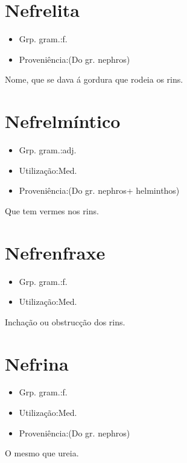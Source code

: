 \section{Nefrelita}
\begin{itemize}
\item {Grp. gram.:f.}
\end{itemize}
\begin{itemize}
\item {Proveniência:(Do gr. \textunderscore nephros\textunderscore )}
\end{itemize}
Nome, que se dava á gordura que rodeia os rins.
\section{Nefrelmíntico}
\begin{itemize}
\item {Grp. gram.:adj.}
\end{itemize}
\begin{itemize}
\item {Utilização:Med.}
\end{itemize}
\begin{itemize}
\item {Proveniência:(Do gr. \textunderscore nephros\textunderscore  + \textunderscore helminthos\textunderscore )}
\end{itemize}
Que tem vermes nos rins.
\section{Nefrenfraxe}
\begin{itemize}
\item {Grp. gram.:f.}
\end{itemize}
\begin{itemize}
\item {Utilização:Med.}
\end{itemize}
Inchação ou obstrucção dos rins.
\section{Nefrina}
\begin{itemize}
\item {Grp. gram.:f.}
\end{itemize}
\begin{itemize}
\item {Utilização:Med.}
\end{itemize}
\begin{itemize}
\item {Proveniência:(Do gr. \textunderscore nephros\textunderscore )}
\end{itemize}
O mesmo que \textunderscore ureia\textunderscore .
